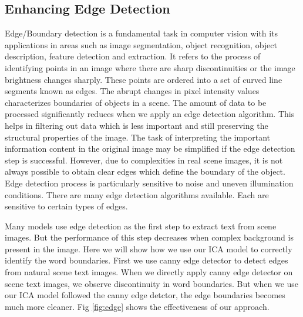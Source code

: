 \subsection{Enhancing Edge Detection}
Edge/Boundary detection is a fundamental task in computer vision with its applications 
in areas such as image segmentation, object recognition, object description, feature detection and extraction. 
It refers to the process of identifying points in an image where there are sharp discontinuities or
the image brightness changes sharply.
These points are ordered into a set of curved line segments known as edges.
The abrupt changes in pixel intensity values characterizes boundaries of objects in a scene.
The amount of data to be processed significantly reduces when we apply an edge detection algorithm.
This helps in filtering out data which is less important and still preserving the structural
properties of the image.
The task of interpreting the important information content in the original 
image may be simplified if the edge detection step is successful. However,
due to complexities in real scene images, it is not always possible to obtain 
clear edges which define the boundary of the object. Edge detection process is particularly sensitive to
noise and uneven illumination conditions. There are many edge detection algorithms available.
Each are sensitive to certain types of edges.

Many models \cite{chap4-6, chap4-7} use edge detection as the first step 
to extract text from scene images. But the performance of this step decreases when 
complex background is present in the image.  
Here we will show how we use our ICA model to correctly identify the word boundaries.
First we use canny edge detector \cite{chap4-5} to detect edges from natural scene text images. 
When we directly apply canny edge detector on scene text images, we observe discontinuity in word boundaries.
But when we use our ICA model followed the canny edge detctor, the edge boundaries becomes much more cleaner.
Fig \ref{fig:edge} shows the effectiveness of our approach.



